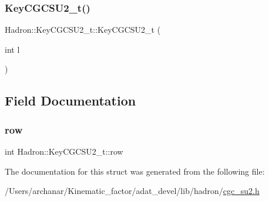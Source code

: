 \mbox{\label{structHadron_1_1KeyCGCSU2__t_abe46c2e3bffc2fd9818d7da7c91983cc}} 
\subsubsection{\texorpdfstring{KeyCGCSU2\_t()}{KeyCGCSU2\_t()}\hspace{0.1cm}{\footnotesize\ttfamily [4/4]}}
{\footnotesize\ttfamily Hadron\+::\+Key\+C\+G\+C\+S\+U2\+\_\+t\+::\+Key\+C\+G\+C\+S\+U2\+\_\+t (\begin{DoxyParamCaption}\item[{int}]{l }\end{DoxyParamCaption})\hspace{0.3cm}{\ttfamily [inline]}}



\subsection{Field Documentation}
\mbox{\label{structHadron_1_1KeyCGCSU2__t_a96e0da2b64dff83f72b594bc4fef5c75}} 
\subsubsection{\texorpdfstring{row}{row}}
{\footnotesize\ttfamily int Hadron\+::\+Key\+C\+G\+C\+S\+U2\+\_\+t\+::row}



The documentation for this struct was generated from the following file\+:\begin{DoxyCompactItemize}
\item 
/\+Users/archanar/\+Kinematic\+\_\+factor/adat\+\_\+devel/lib/hadron/\mbox{\hyperlink{lib_2hadron_2cgc__su2_8h}{cgc\+\_\+su2.\+h}}\end{DoxyCompactItemize}
